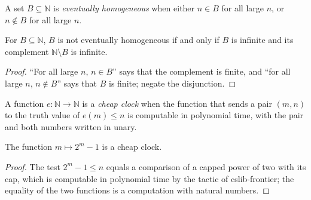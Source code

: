\begin{definition}
  \label{def:structure-homogeneo}
  \leanok
  A set $B \subseteq \mathbb{N}$ is \emph{eventually homogeneous} when either $n \in B$ for all
  large $n$, or $n \notin B$ for all large $n$.
  \own{}
\end{definition}

\begin{proposition}
  \label{prop:structure-no-homogeneo}
  \leanok
  For $B \subseteq \mathbb{N}$, $B$ is not eventually homogeneous if and only if $B$ is infinite and
  its complement $\mathbb{N} \setminus B$ is infinite.
  \own{}
\end{proposition}

\begin{proof}
  \leanok
  ``For all large $n$, $n \in B$'' says that the complement is finite, and ``for all large $n$,
  $n \notin B$'' says that $B$ is finite; negate the disjunction.
\end{proof}

\begin{definition}
  \label{def:structure-reloj-barato}
  \leanok
  A function $e : \mathbb{N} \to \mathbb{N}$ is a \emph{cheap clock} when the function that sends
  a pair $(m, n)$ to the truth value of $e(m) \le n$ is computable in polynomial time, with the
  pair and both numbers written in unary.
  \own{}
\end{definition}

\begin{proposition}
  \label{prop:structure-reloj-dobles}
  \leanok
  The function $m \mapsto 2^m - 1$ is a cheap clock.
  \own{}
\end{proposition}

\begin{proof}
  \leanok
  The test $2^m - 1 \le n$ equals a comparison of a capped power of two with its cap, which is
  computable in polynomial time by the tactic of cslib-frontier; the equality of the two
  functions is a computation with natural numbers.
\end{proof}

